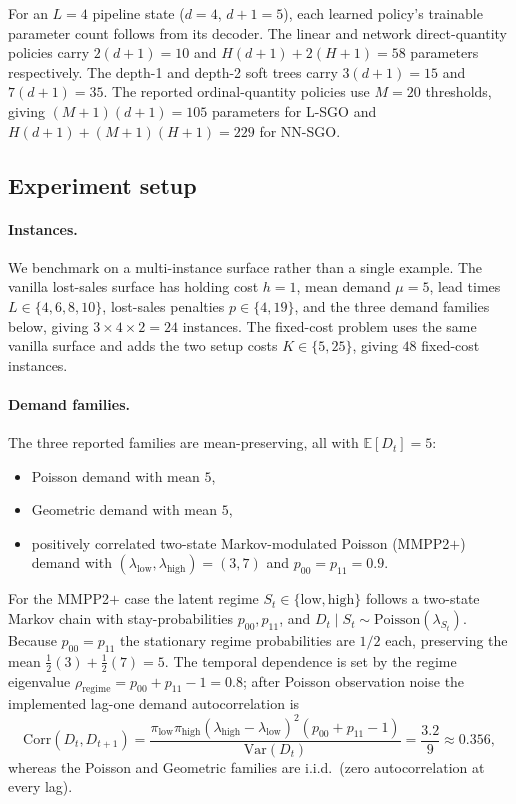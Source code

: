 \documentclass[11pt]{article}
\begin{document}
For an $L=4$ pipeline state ($d=4$, $d+1=5$), each learned policy's trainable parameter count follows
from its decoder. The linear and network direct-quantity policies carry $2(d+1)=10$ and
$H(d+1)+2(H+1)=58$ parameters respectively. The depth-1 and depth-2 soft trees carry $3(d+1)=15$ and
$7(d+1)=35$. The reported ordinal-quantity policies use $M=20$ thresholds, giving
$(M+1)(d+1)=105$ parameters for L-SGO and $H(d+1)+(M+1)(H+1)=229$ for NN-SGO.

\subsection{Experiment setup}

\paragraph{Instances.}
We benchmark on a multi-instance surface rather than a single example. The vanilla lost-sales
surface has holding cost $h=1$, mean demand $\mu=5$, lead times $L\in\{4,6,8,10\}$, lost-sales
penalties $p\in\{4,19\}$, and the three demand families below, giving $3\times4\times2=24$
instances. The fixed-cost problem uses the same vanilla surface and adds the two setup costs
$K\in\{5,25\}$, giving $48$ fixed-cost instances.

\paragraph{Demand families.}
The three reported families are mean-preserving, all with $\mathbb{E}[D_t]=5$:
\begin{itemize}
    \item Poisson demand with mean $5$,
    \item Geometric demand with mean $5$,
    \item positively correlated two-state Markov-modulated Poisson (MMPP2$+$) demand with
    $(\lambda_{\mathrm{low}},\lambda_{\mathrm{high}})=(3,7)$ and $p_{00}=p_{11}=0.9$.
\end{itemize}
For the MMPP2$+$ case the latent regime $S_t\in\{\mathrm{low},\mathrm{high}\}$ follows a two-state
Markov chain with stay-probabilities $p_{00},p_{11}$, and $D_t\mid S_t\sim
\mathrm{Poisson}(\lambda_{S_t})$. Because $p_{00}=p_{11}$ the stationary regime probabilities are
$1/2$ each, preserving the mean $\tfrac12(3)+\tfrac12(7)=5$. The temporal dependence is set by the
regime eigenvalue $\rho_{\mathrm{regime}}=p_{00}+p_{11}-1=0.8$; after Poisson observation noise
the implemented lag-one demand autocorrelation is
\[
\mathrm{Corr}(D_t,D_{t+1})
=\frac{\pi_{\mathrm{low}}\pi_{\mathrm{high}}(\lambda_{\mathrm{high}}-\lambda_{\mathrm{low}})^2
(p_{00}+p_{11}-1)}{\mathrm{Var}(D_t)}=\frac{3.2}{9}\approx0.356,
\]
whereas the Poisson and Geometric families are i.i.d.\ (zero autocorrelation at every lag).
\end{document}
